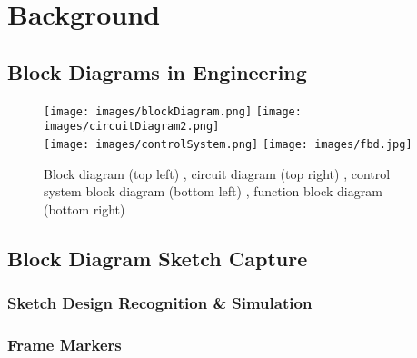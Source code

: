 
\chapter{Background}



\section{Block Diagrams in Engineering}

\begin{figure}[ht!]
\texttt{[image: images/blockDiagram.png]}
\hspace{0.5 cm}
\texttt{[image: images/circuitDiagram2.png]} \\
\texttt{[image: images/controlSystem.png]} 
\hspace{0.5 cm}
\texttt{[image: images/fbd.jpg]} 
\centering
\caption{Block diagram (top left) \cite{wiringDiagrams}, circuit diagram (top right) \cite{engineeronadisk}, control system block diagram (bottom left) \cite{engineeronadisk}, function block diagram (bottom right) \cite{wikicommonsFbd}}
\label{im:blockExample}
\end{figure}




\section{Block Diagram Sketch Capture}



\subsection{Sketch Design Recognition \& Simulation}



\subsection{}



\subsection{Frame Markers}
\label{ch:back:borders}



